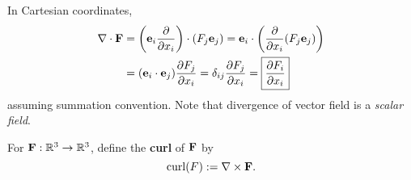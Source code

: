 \begin{note}
    In Cartesian coordinates, 
    \begin{align*}
        \nabla\cdot {\bf F} &= \left( \mathbf{e}_i \frac{\partial }{\partial x_i} \right)\cdot (F_j{\bf e}_j) = {\bf e}_i \cdot \left( \frac{\partial }{\partial x_i}(F_j{\bf e}_j)  \right)\\ 
        &= (\mathbf{e}_i \cdot \mathbf{e}_j)\frac{\partial F_j}{\partial x_i} = \delta_{ij}\frac{\partial F_j}{\partial x_i} = \boxed{\frac{\partial F_i}{\partial x_i} } 
    \end{align*}
    assuming summation convention. Note that divergence of vector field is a \textit{scalar field}.
\end{note}

\begin{definition}[Curl]
    For $ {\bf F}:\mathbb{R}^{3}\to \mathbb{R}^{3} $, define the \textbf{curl} of ${\bf F}$ by 
    \[
        \operatorname{curl}(F):= \nabla\times {\bf F}.
    \]
\end{definition}

